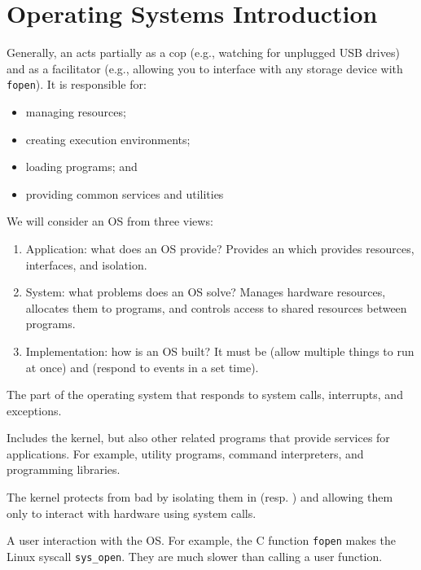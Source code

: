 \chapter{Operating Systems Introduction}

Generally, an  acts partially as a cop (e.g., watching for unplugged USB drives)
and as a facilitator (e.g., allowing you to interface with any storage device with \verb|fopen|).
It is responsible for:
\begin{itemize}[nosep]
  \item managing resources;
  \item creating execution environments;
  \item loading programs; and
  \item providing common services and utilities
\end{itemize}
We will consider an OS from three views:
\begin{enumerate}[1.,nosep]
  \item Application: what does an OS provide?
        Provides an 
        which provides resources, interfaces, and isolation.
  \item System: what problems does an OS solve?
        Manages hardware resources, allocates them to programs,
        and controls access to shared resources between programs.
  \item Implementation: how is an OS built?
        It must be  (allow multiple things to run at once)
        and  (respond to events in a set time).
\end{enumerate}

\begin{defn}[kernel]
  The part of the operating system that responds to system calls,
  interrupts, and exceptions.
\end{defn}
\begin{defn}
  Includes the kernel, but also other related programs that provide services
  for applications. For example, utility programs, command interpreters, and programming libraries.
\end{defn}

The kernel protects from bad  by isolating
them in  (resp. )
and allowing them only to interact with hardware using system calls.

\begin{defn}
  A user interaction with the OS.
  For example, the C function \verb|fopen| makes the Linux syscall
  \verb|sys_open|.
  They are much slower than calling a user function.
\end{defn}

